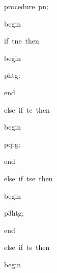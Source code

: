 {
\parindent {}
\medskip

\pagebreak[3] 
\vspace{\neglskip}\mbox{\blc  \blk\idt  \mcl procedure\idt \ pn$;$}\par 
\vspace{\neglskip}\mbox{\blc  \blk\idt  \mcl begin\idt }\par 
\pagebreak[3] 
\vspace{\neglskip}\mbox{\blc  \blk\blk\idt  \mcl if\idt \ tne\ \mcl then\idt }\par 
\vspace{\neglskip}\mbox{\blc  \blk\blk\blk\idt  \mcl begin\idt }\par 
\vspace{\neglskip}\mbox{\blc  \blk\blk\blk\blk\idt  phtg$;$\ }\par 
\vspace{\neglskip}\mbox{\blc  \blk\blk\blk\idt  \mcl end\idt }\par 
\pagebreak[3] 
\vspace{\neglskip}\mbox{\blc  \blk\blk\idt  \mcl else\idt \ \mcl if\idt \ te\ \mcl then\idt }\par 
\vspace{\neglskip}\mbox{\blc  \blk\blk\blk\idt  \mcl begin\idt }\par 
\vspace{\neglskip}\mbox{\blc  \blk\blk\blk\blk\idt  pqtg$;$\ }\par 
\vspace{\neglskip}\mbox{\blc  \blk\blk\blk\idt  \mcl end\idt }\par 
\pagebreak[3] 
\vspace{\neglskip}\mbox{\blc  \blk\blk\idt  \mcl else\idt \ \mcl if\idt \ tse\ \mcl then\idt }\par 
\vspace{\neglskip}\mbox{\blc  \blk\blk\blk\idt  \mcl begin\idt }\par 
\vspace{\neglskip}\mbox{\blc  \blk\blk\blk\blk\idt  p3htg$;$\ }\par 
\vspace{\neglskip}\mbox{\blc  \blk\blk\blk\idt  \mcl end\idt }\par 
\pagebreak[3] 
\vspace{\neglskip}\mbox{\blc  \blk\blk\idt  \mcl else\idt \ \mcl if\idt \ ts\ \mcl then\idt }\par 
\vspace{\neglskip}\mbox{\blc  \blk\blk\blk\idt  \mcl begin\idt }\par 
}
